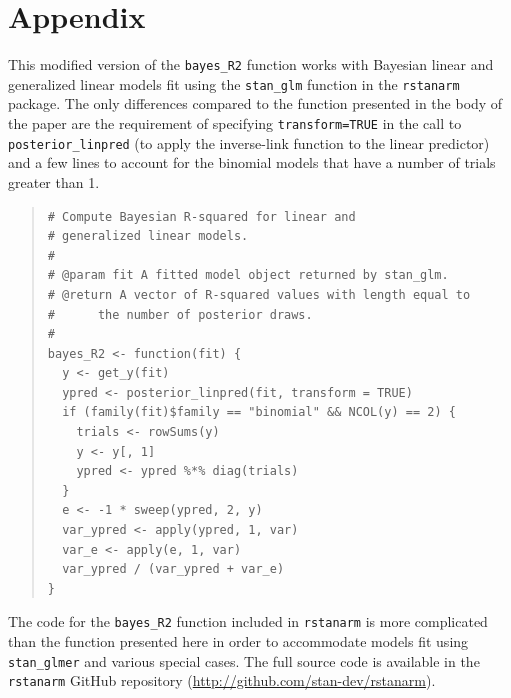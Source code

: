 \documentclass[11pt]{article}
\begin{document}




\clearpage
\section*{Appendix}

This modified version of the \verb#bayes_R2# function works with
Bayesian linear and generalized linear models fit using the
\verb#stan_glm# function in the {\tt rstanarm} package. The only
differences compared to the function presented in the body of the paper are
the requirement of specifying \verb#transform=TRUE# in the call to
\verb#posterior_linpred# (to apply the inverse-link function to the linear
predictor) and a few lines to account for the binomial models that
have a number of trials greater than 1.
%
\vspace{-\baselineskip}
\begin{quotation}
\noindent
\begin{small}
\begin{verbatim}
# Compute Bayesian R-squared for linear and
# generalized linear models.
#
# @param fit A fitted model object returned by stan_glm.
# @return A vector of R-squared values with length equal to
#      the number of posterior draws.
#
bayes_R2 <- function(fit) {
  y <- get_y(fit)
  ypred <- posterior_linpred(fit, transform = TRUE)
  if (family(fit)$family == "binomial" && NCOL(y) == 2) {
    trials <- rowSums(y)
    y <- y[, 1]
    ypred <- ypred %*% diag(trials)
  }
  e <- -1 * sweep(ypred, 2, y)
  var_ypred <- apply(ypred, 1, var)
  var_e <- apply(e, 1, var)
  var_ypred / (var_ypred + var_e)
}
\end{verbatim}
\end{small}
\end{quotation}

\noindent The code for the \verb#bayes_R2# function included in {\tt rstanarm}
is more complicated than the function presented here in order to
accommodate models fit using \verb#stan_glmer# and various special cases.
The full source code is available in the {\tt rstanarm} GitHub repository
(\url{http://github.com/stan-dev/rstanarm}).
\end{document}
